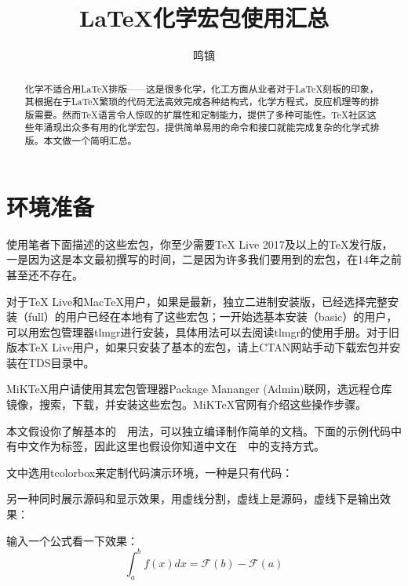 \documentclass[a4paper,UTF8,zihao = -4]{ctexart} %
\title{\textsf{\LaTeX}\heiti 化学宏包使用汇总}
\author{\fangsong 鸣镝}
\date{\oldstylenums{2018/04/23}}
\begin{document}
\pagecolor{lightmilkyellow}

\maketitle %

\begin{abstract} 化学不适合用\LaTeX{}排版——这是很多化学，化工方面从业者对于\LaTeX{}刻板的印象，其根据在于\LaTeX{}繁琐的代码无法高效完成各种结构式，化学方程式，反应机理等的排版需要。然而\TeX{}语言令人惊叹的扩展性和定制能力，提供了多种可能性。\TeX{}社区这些年涌现出众多有用的化学宏包，提供简单易用的命令和接口就能完成复杂的化学式排版。本文做一个简明汇总。
\end{abstract}

\section{环境准备}
\label{sec:envimtPrep}

使用笔者下面描述的这些宏包，你至少需要\TeX{} Live 2017及以上的\TeX{}发行版，一是因为这是本文最初撰写的时间，二是因为许多我们要用到的宏包，在14年之前甚至还不存在。

对于\TeX{} Live和Mac\TeX{}用户，如果是最新，独立二进制安装版，已经选择完整安装（full）的用户已经在本地有了这些宏包；一开始选基本安装（basic）的用户，可以用宏包管理器\textsf{tlmgr}进行安装，具体用法可以去阅读\textsf{tlmgr}的使用手册。对于旧版本\TeX{} Live用户，如果只安装了基本的宏包，请上CTAN网站手动下载宏包并安装在TDS目录中。

MiK\TeX{}用户请使用其宏包管理器\textsf{Package Mananger (Admin)}联网，选远程仓库镜像，搜索，下载，并安装这些宏包。MiK\TeX{}官网有介绍这些操作步骤。

本文假设你了解基本的~\LaTeXe{}~用法，可以独立编译制作简单的文档。下面的示例代码中有中文作为标签，因此这里也假设你知道中文在~\LaTeXe{}~中的支持方式。

文中选用\textsf{tcolorbox}来定制代码演示环境，一种是只有代码：

\begin{dispListing}
\usepackage{tcolorbox} %
\end{dispListing}

另一种同时展示源码和显示效果，用虚线分割，虚线上是源码，虚线下是输出效果：

\begin{dispExample}
输入一个公式看一下效果：\[ \int _a^b f(x)dx = \mathcal{F}(b) - \mathcal{F}(a) \]
\end{dispExample}
\end{document}
